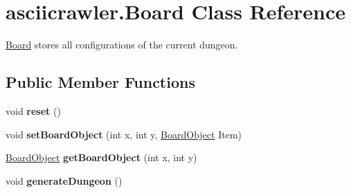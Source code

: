 \hypertarget{classasciicrawler_1_1Board}{}\section{asciicrawler.\+Board Class Reference}
\label{classasciicrawler_1_1Board}


\hyperlink{classasciicrawler_1_1Board}{Board} stores all configurations of the current dungeon.  


\subsection*{Public Member Functions}
\begin{DoxyCompactItemize}
\item 
\mbox{\label{classasciicrawler_1_1Board_aa6d40676bda8efa863277524168d575d}} 
void {\bfseries reset} ()
\item 
\mbox{\label{classasciicrawler_1_1Board_ab1cf721c223fcdafc141fe858c243d60}} 
void {\bfseries set\+Board\+Object} (int x, int y, \hyperlink{classasciicrawler_1_1BoardObject}{Board\+Object} Item)
\item 
\mbox{\label{classasciicrawler_1_1Board_a059f9044f0d0f6dc9c5729c9c8c082a2}} 
\hyperlink{classasciicrawler_1_1BoardObject}{Board\+Object} {\bfseries get\+Board\+Object} (int x, int y)
\item 
\mbox{\label{classasciicrawler_1_1Board_af8fabfec19cd00bb4205e656c505789f}} 
void {\bfseries generate\+Dungeon} ()
\end{DoxyCompactItemize}
